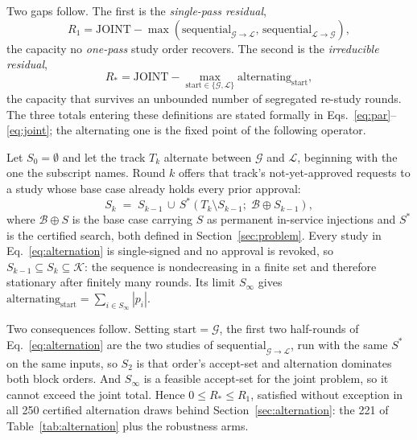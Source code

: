 \documentclass[review,authoryear,12pt]{elsarticle}
\begin{document}
Two gaps follow. The first is the \emph{single-pass residual},
\begin{equation}
R_{1} = \text{JOINT} - \max(\text{sequential}_{\mathcal{G}\to\mathcal{L}},\, \text{sequential}_{\mathcal{L}\to\mathcal{G}}),
\label{eq:residual}
\end{equation}
the capacity no \emph{one-pass} study order recovers. The second is the
\emph{irreducible residual},
\begin{equation}
R_{\ast} = \text{JOINT} - \max_{\text{start} \in \{\mathcal{G},\mathcal{L}\}} \text{alternating}_{\text{start}},
\label{eq:residual-alt}
\end{equation}
the capacity that survives an unbounded number of segregated re-study rounds.
The three totals entering these definitions are stated formally in
Eqs.~\eqref{eq:par}--\eqref{eq:joint}; the alternating one is the fixed point
of the following operator.

Let $S_0 = \emptyset$ and let the track $T_k$ alternate between $\mathcal{G}$
and $\mathcal{L}$, beginning with the one the subscript names. Round $k$
offers that track's not-yet-approved requests to a study whose base case
already holds every prior approval:
\begin{equation}
S_k \;=\; S_{k-1} \,\cup\, S^{\ast}\!\left(T_k \setminus S_{k-1};\;
          \mathcal{B} \oplus S_{k-1}\right),
\label{eq:alternation}
\end{equation}
where $\mathcal{B} \oplus S$ is the base case carrying $S$ as permanent
in-service injections and $S^{\ast}$ is the certified search, both defined in
Section~\ref{sec:problem}. Every study in Eq.~\eqref{eq:alternation} is
single-signed and no approval is revoked, so $S_{k-1} \subseteq S_k \subseteq
\mathcal{K}$: the sequence is nondecreasing in a finite set and therefore
stationary after finitely many rounds. Its limit $S_\infty$ gives
$\text{alternating}_{\text{start}} = \sum_{i \in S_\infty} |p_i|$.

Two consequences follow. Setting $\text{start}=\mathcal{G}$, the first two
half-rounds of Eq.~\eqref{eq:alternation} are the two studies of
$\text{sequential}_{\mathcal{G}\to\mathcal{L}}$, run with the same $S^{\ast}$
on the same inputs, so $S_2$ is that order's accept-set and alternation
dominates both block orders. And $S_\infty$ is a feasible accept-set for the
joint problem, so it cannot exceed the joint total. Hence $0 \le R_{\ast} \le
R_{1}$, satisfied without exception in all 250 certified alternation draws
behind Section~\ref{sec:alternation}: the 221 of
Table~\ref{tab:alternation} plus the robustness arms.
\end{document}
